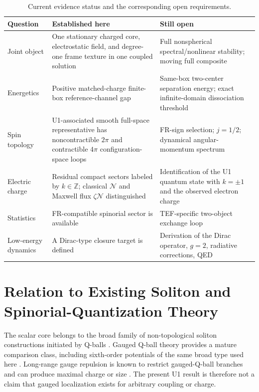 \documentclass[11pt]{article}
\begin{document}
\begin{table}[t]
\centering
\small
\caption{Current evidence status and the corresponding open requirements.}
\label{tab:evidence-status}
\begin{tabular}{p{}p{}p{}}
\toprule
\textbf{Question} & \textbf{Established here} & \textbf{Still open}\\
\midrule
Joint object &
One stationary charged core, electrostatic field, and degree-one frame texture in one coupled solution &
Full nonspherical spectral/nonlinear stability; moving full composite
\\[1mm]
Energetics &
Positive matched-charge finite-box reference-channel gap &
Same-box two-center separation energy; exact infinite-domain dissociation threshold
\\[1mm]
Spin topology &
U1-associated smooth full-space representative has noncontractible \(2\pi\) and contractible \(4\pi\) configuration-space loops &
FR-sign selection; \(j=1/2\); dynamical angular-momentum spectrum
\\[1mm]
Electric charge &
Residual compact sectors labeled by \(k\in\mathbb Z\); classical \(\mathcal N\) and Maxwell flux \(\zeta\mathcal N\) distinguished &
Identification of the U1 quantum state with \(k=\pm1\) and the observed electron charge
\\[1mm]
Statistics &
FR-compatible spinorial sector is available &
TEF-specific two-object exchange loop
\\[1mm]
Low-energy dynamics &
A Dirac-type closure target is defined &
Derivation of the Dirac operator, \(g=2\), radiative corrections, QED
\\
\bottomrule
\end{tabular}
\end{table}

\section{Relation to Existing Soliton and Spinorial-Quantization Theory}

The scalar core belongs to the broad family of non-topological soliton constructions initiated by Q-balls \cite{Coleman1985}. Gauged Q-ball theory provides a mature comparison class, including sixth-order potentials of the same broad type used here \cite{Lee1989,HanSu2023}. Long-range gauge repulsion is known to restrict gauged-Q-ball branches and can produce maximal charge or size \cite{HeeckZhi2026}. The present U1 result is therefore not a claim that gauged localization exists for arbitrary coupling or charge.
\end{document}
